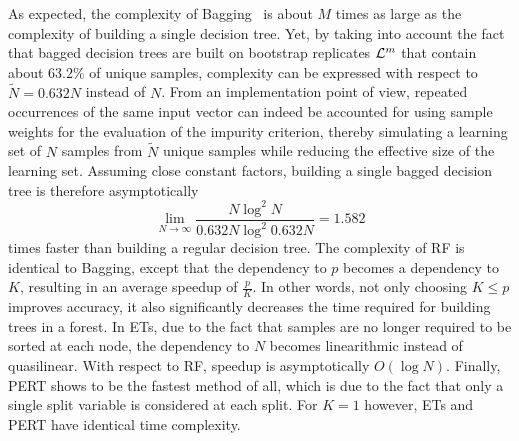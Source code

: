 As expected, the complexity of Bagging~\citep{breiman:1996b} is about $M$ times
as large as the complexity of building a single decision tree. Yet, by taking
into account the fact that bagged decision trees are built on bootstrap
replicates ${\cal L}^m$ that contain about $63.2\%$ of unique samples,
complexity can be expressed with respect to $\widetilde{N} = 0.632 N$ instead
of $N$. From an implementation point of view, repeated occurrences of the same
input vector can indeed be accounted for using sample weights for the
evaluation of the impurity criterion, thereby  simulating a learning set of $N$
samples from $\widetilde{N}$ unique samples while reducing the effective size
of the learning set. Assuming close constant factors, building a single bagged
decision tree is therefore asymptotically
\begin{equation}
\lim_{N\to \infty} \frac{N\log^2 N}{0.632N \log^2 0.632N} = 1.582
\end{equation}
times faster than building a regular decision tree. The complexity of RF is
identical to Bagging, except that the dependency
to $p$ becomes a dependency to $K$, resulting in an average speedup of
$\tfrac{p}{K}$. In other words, not only choosing $K \leq p$ improves accuracy,
it also significantly decreases the time required for building trees in a
forest. In ETs, due to the fact that
samples are no longer required to be sorted at each node, the dependency to $N$
becomes linearithmic instead of quasilinear. With respect to RF,
speedup is asymptotically $O(\log N)$. Finally, PERT shows to be the fastest
method of all, which is due to the fact that only a single split variable
is considered at each split. For $K=1$ however, ETs and PERT have identical
time complexity.

